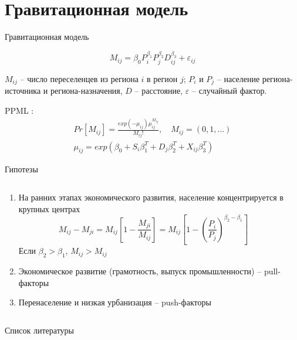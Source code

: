 \documentclass[aspectratio=169]{beamer}
\begin{document}
\section{Гравитационная модель}
\begin{frame}{Гравитационная модель}

\begin{equation*}
	M_{ij} = \beta_0 P^{\beta_1}_{i} P^{\beta_2}_{j} D^{\beta_3}_{ij} + \varepsilon_{ij}
\end{equation*}

$M_{ij}$ – число переселенцев из региона $i$ в регион $j$; $P_i$ и $P_j$ -- население региона-источника и региона-назначения, $D$ -- расстояние, $\varepsilon$ -- случайный фактор.

PPML \citep{silva_log_2006}:
\begin{gather*}
	Pr[M_{ij}] = \frac{exp(-\mu_{ij})\mu^{M_{ij}}_{ij}}{M_{ij}!},\quad M_{ij} = (0, 1, ...) \\
	\mu_{ij} = exp(\beta_0 + S_i \beta_1^T + D_{j} \beta_2^T + X_{ij} \beta_3^T)
\end{gather*}

\end{frame}

\begin{frame}{Гипотезы}

\begin{columns}
	\begin{column}{0.60\textwidth}
		\begin{enumerate}
			\item На ранних этапах экономического развития, население концентрируется в крупных центрах
			\begin{equation*}
                    M_{ij} - M_{ji} = M_{ij} \left[ 1 - \frac{M_{ji}}{M_{ij}} \right] = M_{ij} \left[ 1 - \left( \frac{P_i}{P_j} \right)^{\beta_2 - \beta_1} \right]
			\end{equation*}
			Если $\beta_2>\beta_1$, $M_{ij}>M_{ij}$ \citep{poot_gravity_2016}
			\item Экономическое развитие (грамотность, выпуск промышленности) -- pull-факторы
			\item Перенаселение и низкая урбанизация -- push-факторы
		\end{enumerate}
	\end{column}
	
	\begin{column}{0.34\textwidth}
		
	\end{column}
\end{columns}

\end{frame}

\begin{frame}[shrink=10]{Список литературы}
    \printbibliography
\end{frame}
\end{document}
